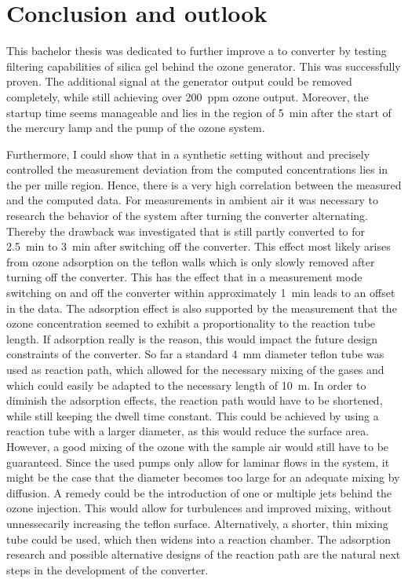\section{Conclusion and outlook}
\label{sec:conclusion}

This bachelor thesis was dedicated to further improve a  to
 converter by testing  filtering capabilities of silica gel
behind the ozone generator. This was successfully proven. The
additional  signal at the generator output could be removed
completely, while still achieving over \SI{200}{ppm} ozone
output. Moreover, the startup time seems manageable and lies in the
region of \SI{5}{\minute} after the start of the mercury lamp and the
pump of the ozone system. 

Furthermore, I could show that in a synthetic setting without 
and precisely controlled  the measurement deviation from the
computed  concentrations lies in the per mille region. Hence,
there is a very high correlation between the measured and the computed
data. For measurements in ambient air it was necessary to research the
behavior of the system after turning the converter alternating.
Thereby the drawback was investigated that  is still partly
converted to  for \SI{2.5}{\minute} to \SI{3}{\minute} after
switching off the converter. This effect most likely arises from ozone
adsorption on the teflon walls which is only slowly removed after
turning off the converter. This has the effect that in a measurement
mode switching on and off the converter within approximately
\SI{1}{\minute} leads to an offset in the  data.  The
adsorption effect is also supported by the measurement that the ozone
concentration seemed to exhibit a proportionality to the reaction tube
length. If adsorption really is the reason, this would impact the
future design constraints of the converter. So far a standard
\SI{4}{\milli\meter} diameter teflon tube was used as reaction path,
which allowed for the necessary mixing of the gases and which could
easily be adapted to the necessary length of \SI{10}{\meter}. In order
to diminish the adsorption effects, the reaction path would have to be
shortened, while still keeping the dwell time constant. This could be
achieved by using a reaction tube with a larger diameter, as this
would reduce the surface area. However, a good mixing of the ozone
with the sample air would still have to be guaranteed. Since the used
pumps only allow for laminar flows in the system, it might be the case
that the diameter becomes too large for an adequate mixing by
diffusion. A remedy could be the introduction of one or multiple jets
behind the ozone injection. This would allow for turbulences and
improved mixing, without unnessecarily increasing the teflon
surface. Alternatively, a shorter, thin mixing tube could be used,
which then widens into a reaction chamber. The adsorption research and
possible alternative designs of the reaction path are the natural next
steps in the development of the converter.

